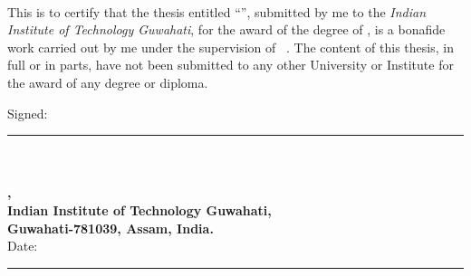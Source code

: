 \documentclass[11pt, a4paper, twoside]{Thesis} %
\begin{document}
\clearpage %

\pagestyle{empty} %

\begin{titlepage}
\begin{center}
\textsc{\textbf{\fontsize{31}{32}\selectfont{Declaration}}}\\[2.0cm] %
\end{center}

 \vspace{0.5cm}

This is to certify that the thesis entitled ``\textbf{\thesisTitle}'',
submitted by me to the \textit{Indian Institute of Technology Guwahati}, for the award of the degree of \degreeName, is a
bonafide work carried out by me under the supervision
of \supervisorTitle \ \supervisorName. The content of this thesis, in full or in parts, have not
been submitted to any other University or Institute for the award
of any degree or diploma.

\vspace{3cm}

Signed:\\ \rule[1em]{25em}{0.5pt}\\[0.1cm] %
\textbf{\authorName}\\
\textbf{\departmentName,}\\
\textbf{Indian Institute of Technology Guwahati,}\\
\textbf{Guwahati-781039, Assam, India.}\\[2cm] \hfill{}Date:\\ \rule[1em]{25em}{0.5pt} %
\end{titlepage}


% 
\end{document}

